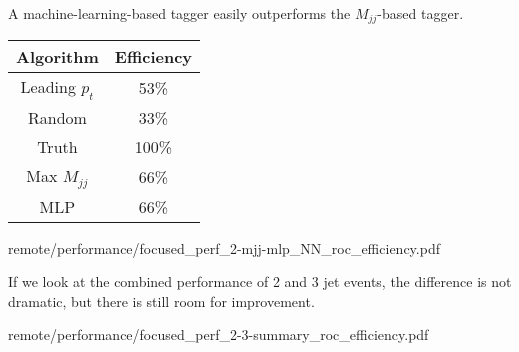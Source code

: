     { \footnotesize
        A machine-learning-based tagger easily outperforms the $M_{jj}$-based tagger.

        \vspace{5mm}

        \begin{tabular}{|c|c|}\hline
        Algorithm & Efficiency \\ \hline
        Leading $p_t$ & 53\% \\ \hline
        Random & 33\% \\ \hline
        Truth & 100\% \\ \hline
        Max $M_{jj}$ & 66\% \\ \hline
        MLP & 66\% \\ \hline
        \end{tabular}
    }
    {remote/performance/focused_perf_2-mjj-mlp_NN_roc_efficiency.pdf}

    {
        If we look at the combined performance of 2 and 3 jet events,
        the difference is not dramatic, but there is still room for improvement.

    }
    {remote/performance/focused_perf_2-3-summary_roc_efficiency.pdf}
